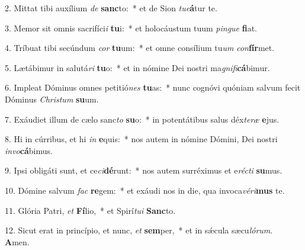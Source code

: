 2. Mittat tibi auxílium \textit{de} \textbf{sanc}to:~*  et de Sion \textit{tu}\textit{e}\textbf{á}tur te.\

3. Memor sit omnis sacrifíci\textit{i} \textbf{tu}i:~*  et holocáustum tuum \textit{pin}\textit{gue} \textbf{fi}at.\

4. Tríbuat tibi secúndum \textit{cor} \textbf{tu}um:~*  et omne consílium tu\textit{um} \textit{con}\textbf{fír}met.\

5. Lætábimur in salutá\textit{ri} \textbf{tu}o:~*  et in nómine Dei nostri ma\textit{gni}\textit{fi}\textbf{cá}bimur.\

6. Impleat Dóminus omnes petitió\textit{nes} \textbf{tu}as:~*  nunc cognóvi quóniam salvum fecit Dóminus \textit{Chris}\textit{tum} \textbf{su}um.\

7. Exáudiet illum de cælo sanc\textit{to} \textbf{su}o:~*  in potentátibus salus déx\textit{te}\textit{ræ} \textbf{e}jus.\

8. Hi in cúrribus, et hi \textit{in} \textbf{e}quis:~*  nos autem in nómine Dómini, Dei nostri \textit{in}\textit{vo}\textbf{cá}bimus.\

9. Ipsi obligáti sunt, et ce\textit{ci}\textbf{dé}runt:~*  nos autem surréximus et e\textit{réc}\textit{ti} \textbf{su}mus.\

10. Dómine salvum \textit{fac} \textbf{re}gem:~*  et exáudi nos in die, qua invoca\textit{vé}\textit{ri}\textbf{mus} te.\

11. Glória Patri, \textit{et} \textbf{Fí}lio,~*  et Spirí\textit{tu}\textit{i} \textbf{Sanc}to.\

12. Sicut erat in princípio, et nunc, \textit{et} \textbf{sem}per,~*  et in sǽcula sæcu\textit{ló}\textit{rum}. \textbf{A}men.\

